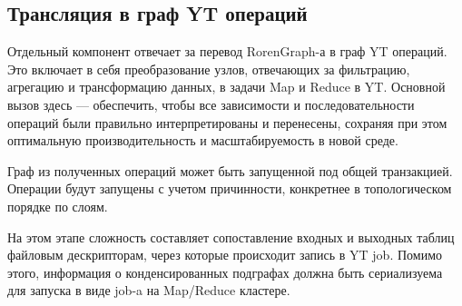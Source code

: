 \subsection{Трансляция в граф YT операций}

Отдельный компонент отвечает за перевод RorenGraph-а в граф YT операций. Это включает в себя преобразование узлов, отвечающих за фильтрацию, агрегацию и трансформацию данных, в задачи Map и Reduce в YT. Основной вызов здесь — обеспечить, чтобы все зависимости и последовательности операций были правильно интерпретированы и перенесены, сохраняя при этом оптимальную производительность и масштабируемость в новой среде.

Граф из полученных операций может быть запущенной под общей транзакцией. Операции будут запущены с учетом причинности, конкретнее в топологическом порядке по слоям.

На этом этапе сложность составляет сопоставление входных и выходных таблиц файловым дескрипторам, через которые происходит запись в YT job. Помимо этого, информация о конденсированных подграфах должна быть сериализуема для запуска в виде job-a на Map/Reduce кластере.
